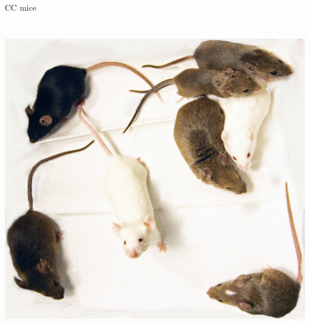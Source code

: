 \documentclass[12pt]{article}
\newcommand{\headsize}{\fontsize{35}{35} \selectfont}
\begin{document}
\newpage


\headsize \color{myyellow}
\hfill \begin{minipage}{5.75in}
\centering
CC mice
\end{minipage}

\vfill

\centerline{\includegraphics[height=5.5in]{Figs/ccmice.png}}


\vfill
\end{document}
